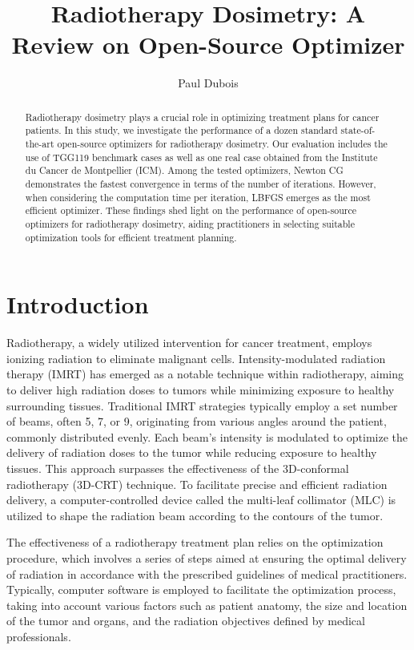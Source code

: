 \documentclass[a4paper]{article}
\title{Radiotherapy Dosimetry: A Review on Open-Source Optimizer}
\author{Paul Dubois}
\begin{document}
	
	\maketitle
	
	\begin{abstract}
		Radiotherapy dosimetry plays a crucial role in optimizing treatment plans for cancer patients.
		In this study, we investigate the performance of a dozen standard state-of-the-art open-source optimizers for radiotherapy dosimetry.
		Our evaluation includes the use of TGG119 benchmark cases as well as one real case obtained from the Institute du Cancer de Montpellier (ICM).
		Among the tested optimizers, Newton CG demonstrates the fastest convergence in terms of the number of iterations.
		However, when considering the computation time per iteration, LBFGS emerges as the most efficient optimizer.
		These findings shed light on the performance of open-source optimizers for radiotherapy dosimetry, aiding practitioners in selecting suitable optimization tools for efficient treatment planning.
	\end{abstract}
	
	\section{Introduction}
	Radiotherapy, a widely utilized intervention for cancer treatment, employs ionizing radiation to eliminate malignant cells.
	Intensity-modulated radiation therapy (IMRT) has emerged as a notable technique within radiotherapy, aiming to deliver high radiation doses to tumors while minimizing exposure to healthy surrounding tissues.
	Traditional IMRT strategies typically employ a set number of beams, often 5, 7, or 9, originating from various angles around the patient, commonly distributed evenly.
	Each beam's intensity is modulated to optimize the delivery of radiation doses to the tumor while reducing exposure to healthy tissues.
	This approach surpasses the effectiveness of the 3D-conformal radiotherapy (3D-CRT) technique.
	To facilitate precise and efficient radiation delivery, a computer-controlled device called the multi-leaf collimator (MLC) is utilized to shape the radiation beam according to the contours of the tumor.
	
	The effectiveness of a radiotherapy treatment plan relies on the optimization procedure, which involves a series of steps aimed at ensuring the optimal delivery of radiation in accordance with the prescribed guidelines of medical practitioners.
	Typically, computer software is employed to facilitate the optimization process, taking into account various factors such as patient anatomy, the size and location of the tumor and organs, and the radiation objectives defined by medical professionals.
	
\end{document}
